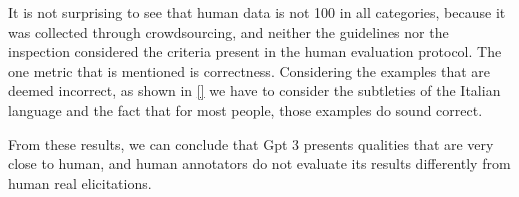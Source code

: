 It is not surprising to see that human data is not 100 in all categories, because it was collected through crowdsourcing, and neither the guidelines nor the inspection considered the criteria present in the human evaluation protocol. The one metric that is mentioned is correctness. Considering the examples that are deemed incorrect, as shown in \ref{} we have to consider the subtleties of the Italian language and the fact that for most people, those examples do sound correct. 

From these results, we can conclude that Gpt 3 presents qualities that are very close to human, and human annotators do not evaluate its results differently from human real elicitations. 